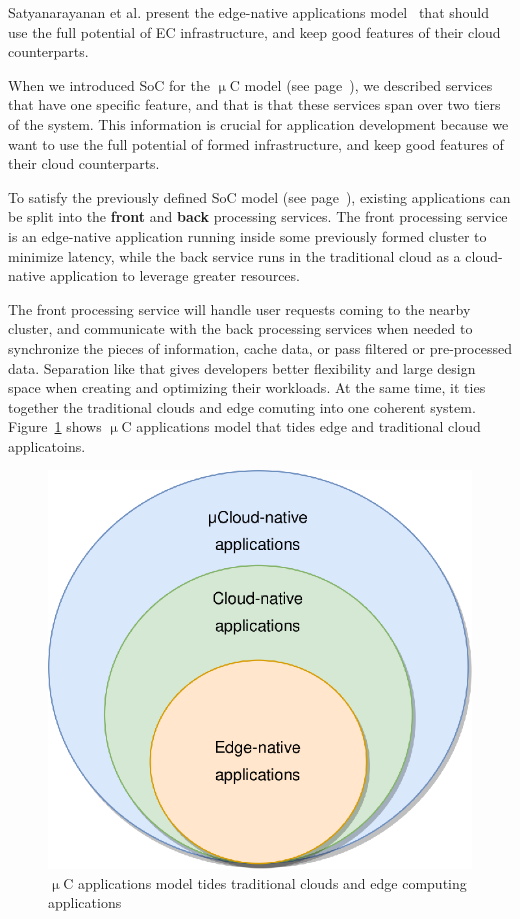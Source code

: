 Satyanarayanan et al. present the edge-native applications model~\cite{SatyanarayananK19} that should use the full potential of EC infrastructure, and keep good features of their cloud counterparts. 

When we introduced SoC for the $\upmu$C model (see page~\pageref{services}), we described services that have one specific feature, and that is that these services span over two tiers of the system. This information is crucial for application development because we want to use the full potential of formed infrastructure, and keep good features of their cloud counterparts.

To satisfy the previously defined SoC model (see page~\pageref{services}), existing applications can be split into the \textbf{front} and \textbf{back} processing services. The front processing service is an edge-native application running inside some previously formed cluster to minimize latency, while the back service runs in the traditional cloud as a cloud-native application to leverage greater resources.

The front processing service will handle user requests coming to the nearby cluster, and communicate with the back processing services when needed to synchronize the pieces of information, cache data, or pass filtered or pre-processed data. Separation like that gives developers better flexibility and large design space when creating and optimizing their workloads. At the same time, it ties together the traditional clouds and edge comuting into one coherent system. Figure~\ref{fig:fig29} shows $\upmu$C applications model that tides edge and traditional cloud applicatoins.

\begin{figure}[H]
	\begin{center}
		\includegraphics[scale=0.85]{images/Figure29}
	\end{center}
	\vspace{-0.7cm}
	\caption{$\upmu$C applications model tides traditional clouds and edge computing applications}
	\label{fig:fig29}
\end{figure}

